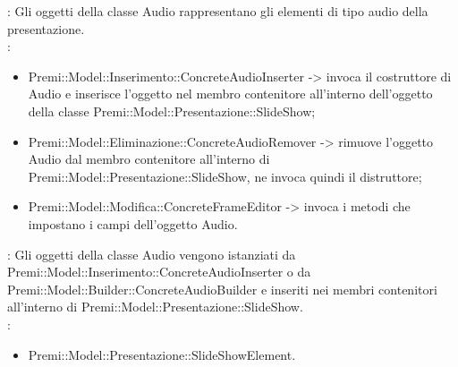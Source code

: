 {{{{{				\textbf{\tipo}: Gli oggetti della classe Audio rappresentano gli elementi di tipo audio della presentazione.\\
				\textbf{\relaz}: 
				\begin{itemize}
					\item Premi::Model::Inserimento::ConcreteAudioInserter -> invoca il costruttore di Audio e inserisce l’oggetto nel membro contenitore all’interno dell’oggetto della classe Premi::Model::Presentazione::SlideShow;
                    \item Premi::Model::Eliminazione::ConcreteAudioRemover -> rimuove l’oggetto Audio dal membro contenitore all’interno di Premi::Model::Presentazione::SlideShow, ne invoca quindi il distruttore;
                    \item Premi::Model::Modifica::ConcreteFrameEditor -> invoca i metodi che impostano i campi dell’oggetto Audio.
				\end{itemize}	
                \textbf{\interfacce}: Gli oggetti della classe Audio vengono istanziati da Premi::Model::Inserimento::ConcreteAudioInserter  o da Premi::Model::Builder::ConcreteAudioBuilder e inseriti nei membri contenitori all’interno di Premi::Model::Presentazione::SlideShow.\\
                \textbf{\base}: 
                    \begin{itemize}
                    \item Premi::Model::Presentazione::SlideShowElement.
                    \end{itemize}
                    }
                    }}}}
